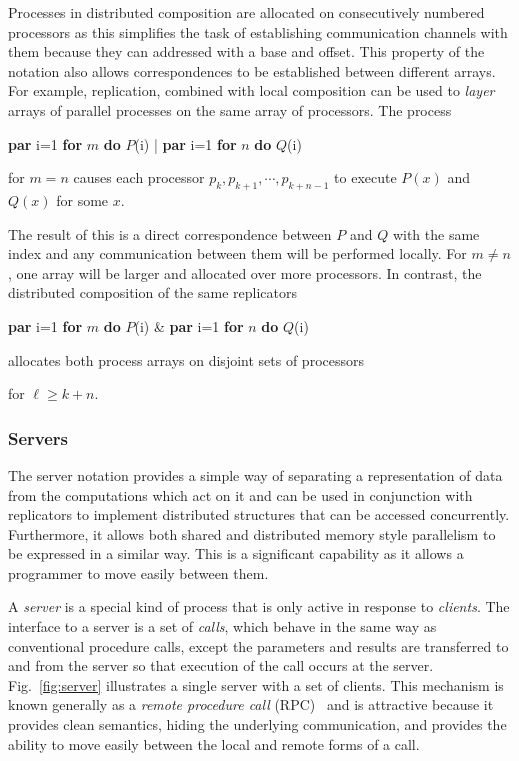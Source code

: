 \documentclass[11pt, conference, compsocconf, onecolumn]{IEEEtran}
\newcommand{\fig}[1]{Fig.~\ref{fig:#1}}
\newcounter{process}
\newcommand{\w}[1]{{\bf #1}}
\newcommand{\inputtikz}[1]{
\begin{center}\end{center}}
\def\codespacing{1.5mm}
\newenvironment{myquote}
{\list{}{\leftmargin=4mm\rightmargin=4mm}\item[]}
{\endlist}
\newenvironment{code*}{\vspace{\codespacing}\begin{myquote}\begin{minipage}{\linewidth}\begin{alltt}}
{\end{alltt}\end{minipage}
\end{myquote}\vspace{\codespacing}
}
\begin{document}
Processes in distributed composition are allocated on consecutively numbered
processors as this simplifies the task of establishing communication channels
with them because they can addressed with a base and offset.
This property of the notation also allows correspondences to be
established between different arrays.
For example, replication, combined with local composition can be used to
\emph{layer} arrays of parallel processes on the same array of processors. The
process
\begin{code*}
\w{par} i=1 \w{for} \(m\) \w{do} \(P\)(i) | 
\w{par} i=1 \w{for} \(n\) \w{do} \(Q\)(i)
\end{code*}
for $m=n$ causes each processor $p_k,p_{k+1},\cdots,p_{k+n-1}$ to execute
$P(x)$ and $Q(x)$ for some $x$.
\inputtikz{figures/par-replication-layered}
The result of this is a direct correspondence between $P$ and $Q$
with the same index and any communication between them will be performed
locally. For $m\neq n$, one array will be larger and allocated over more
processors.
In contrast, the distributed composition of the same replicators
\begin{code*}
\w{par} i=1 \w{for} \(m\) \w{do} \(P\)(i) \& 
\w{par} i=1 \w{for} \(n\) \w{do} \(Q\)(i)
\end{code*}
allocates both process arrays on disjoint sets of processors
\inputtikz{figures/par-replication-disjoint}
for $\ell \geq k+n$.

\subsubsection{Servers\label{sec:servers}}

The server notation provides a simple way of separating a representation of
data from the computations which act on it and can be used in conjunction with
replicators to implement distributed structures that can be accessed
concurrently.
Furthermore, it allows both shared and distributed memory style parallelism to
be expressed in a similar way. This is a significant capability as it allows a
programmer to move easily between them. 

A \emph{server} is a special kind of process that is only active in response to
\emph{clients}. The interface to a server is a set of \emph{calls}, which
behave in the same way as conventional procedure calls, except the parameters
and results are transferred to and from the server so that execution of the
call occurs at the server. \fig{server} illustrates a single server with a set
of clients.
This mechanism is known generally as a \emph{remote procedure call}
(RPC)~\cite{Birrell84} and is attractive because it provides clean semantics,
hiding the underlying communication, and provides the ability to move easily
between the local and remote forms of a call.
\end{document}
